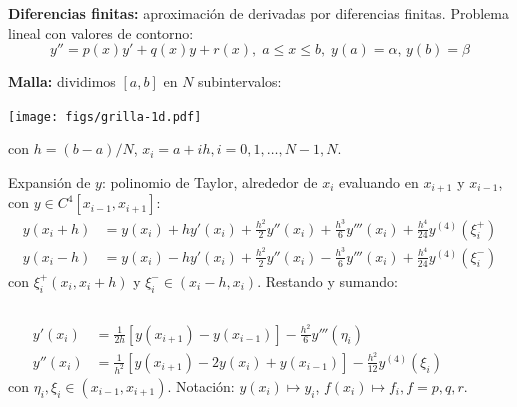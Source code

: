 \documentclass[9pt, aspectratio=169]{beamer}
\begin{document}
\begin{frame}  %
\textbf{Diferencias finitas:} aproximación de derivadas por diferencias finitas. Problema lineal con valores de contorno:
\begin{equation} y'' = p(x) y' + q(x) y + r(x), \; a \leq x \leq b, \; y(a) = \alpha, \, y(b) = \beta \label{eq:plineal} \end{equation} \pause
\vspace{-1.0em}

\textbf{Malla:} dividimos $[a, b]$ en $N$ subintervalos:
\begin{center}
    \texttt{[image: figs/grilla-1d.pdf]}
\end{center}
con $h = (b-a)/N$, $x_i = a + ih, i = 0, 1, \ldots, N-1, N$. \pause

Expansión de $y$: polinomio de Taylor, alrededor de $x_i$ evaluando en $x_{i+1}$ y $x_{i-1}$, con $y \in C^4[x_{i-1}, x_{i+1}]$:
\begin{align*}
    y(x_i+h) &= y(x_i) + h y'(x_i) + \frac{h^2}{2} y''(x_i) + \frac{h^3}{6} y'''(x_i) + \frac{h^4}{24} y^{(4)}(\xi_i^+) \\
    y(x_i-h) &= y(x_i) - h y'(x_i) + \frac{h^2}{2} y''(x_i) - \frac{h^3}{6} y'''(x_i) + \frac{h^4}{24} y^{(4)}(\xi_i^-) 
\end{align*}
con $\xi_i^+ (x_i, x_i+h)$ y $\xi_i^- \in (x_i - h, x_i)$. Restando y sumando: \vspace{-0.5em}
\begin{columns}
\begin{equation}
    \begin{split}
    y'(x_i) &=\frac{1}{2h} [y(x_{i+1}) - y(x_{i-1})] - \frac{h^2}{6} y'''(\eta_i) \\
y''(x_i) &= \frac{1}{h^2} [ y(x_{i+1}) - 2 y(x_i) + y(x_{i-1})] - \frac{h^2}{12} y^{(4)}(\xi_i)
\end{split}
\label{eq:diffin}
\end{equation}
con $\eta_i, \xi_i \in (x_{i-1}, x_{i+1})$. 
Notación: $y(x_i) \mapsto y_i$, $f(x_i) \mapsto f_i, f = p, q, r$.
\end{columns}
\end{frame}
\end{document}
